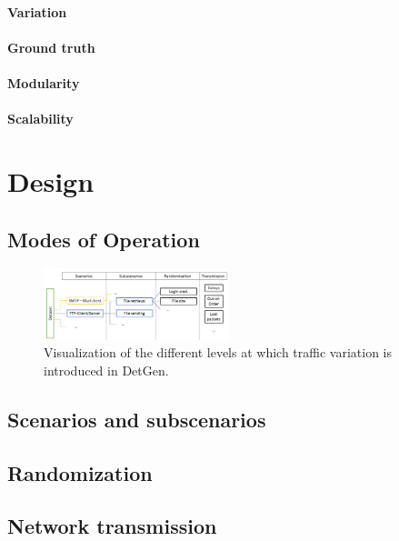 \documentclass[sigconf]{acmart}
\begin{document}
\paragraph{Variation}
 
\paragraph{Ground truth} 

\paragraph{Modularity}

\paragraph{Scalability} 


\section{Design}\label{Sec:Design}

\subsection{Modes of Operation}


\begin{figure}
 \centering 
 \includegraphics[width=0.480\textwidth]{images/scenario_branching.PNG}
 \caption{Visualization of the different levels at which traffic variation is introduced in DetGen.}
 \label{Fig:branching}
\end{figure}


\subsection{Scenarios and subscenarios}
\label{Sec:Scenarios}

\subsection{Randomization}\label{Sec:randomsubscen}

\subsection{Network transmission}\label{Sec:Netrand}
\end{document}

